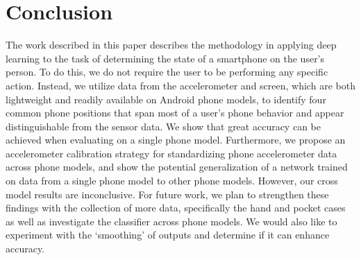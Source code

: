 \section{Conclusion}
The work described in this paper describes the methodology in applying deep learning to the task of determining the state of a smartphone on the user's person. 
To do this, we do not require the user to be performing any specific action.
Instead, we utilize data from the accelerometer and screen, which are both lightweight and readily available on Android phone models, to identify four common phone positions that span most of a user's phone behavior
and appear distinguishable from the sensor data. 
We show that great accuracy can be achieved when evaluating on a single phone model.
Furthermore, we propose an accelerometer calibration strategy for standardizing phone accelerometer
data across phone models, and show the potential generalization of a network trained on data from a single phone model to other phone models.
 However, our cross model results are inconclusive. 
 For future work, we plan to strengthen these findings with the collection of more data, specifically the hand and pocket cases as well as investigate the classifier across phone models.
We would also like to experiment with the `smoothing' of outputs and determine if it can enhance accuracy.